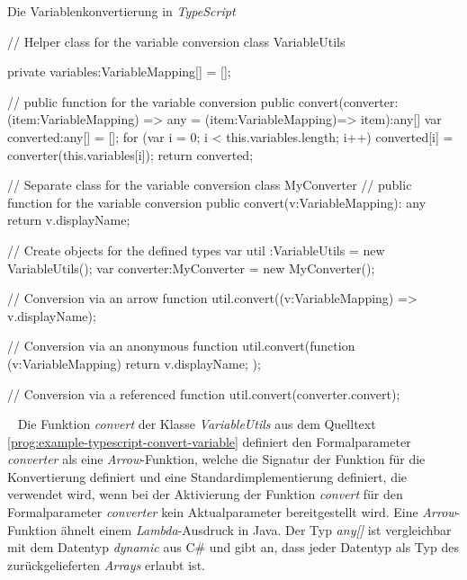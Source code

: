 \begin{program}[h]
\caption{Die Variablenkonvertierung in \emph{TypeScript}}
\label{prog:example-typescript-convert-variable}
\begin{JsCode}
// Helper class for the variable conversion
class VariableUtils {
    private variables:VariableMapping[] = [];
	
    // public function for the variable conversion
    public convert(converter:(item:VariableMapping) => any 
    	                    = (item:VariableMapping)=> item):any[] {
        var converted:any[] = [];
        for (var i = 0; i < this.variables.length; i++) {
            converted[i] = converter(this.variables[i]);
        }
        return converted;	            
    }
}

// Separate class for the variable conversion
class MyConverter {
    // public function for the variable conversion
    public convert(v:VariableMapping): any {
        return v.displayName;
    }
}

// Create objects for the defined types
var util     :VariableUtils = new VariableUtils();
var converter:MyConverter   = new MyConverter();

// Conversion via an arrow function
util.convert((v:VariableMapping) => v.displayName);

// Conversion via an anonymous function
util.convert(function (v:VariableMapping) {
    return v.displayName;
});

// Conversion via a referenced function
util.convert(converter.convert);
\end{JsCode} 
\end{program}
\ \newline
Die Funktion \emph{convert} der Klasse \emph{VariableUtils} aus dem Quelltext \ref{prog:example-typescript-convert-variable} definiert den Formalparameter \emph{converter} als eine \emph{Arrow}-Funktion, welche die Signatur der Funktion für die Konvertierung definiert und eine Standardimplementierung definiert, die verwendet wird, wenn bei der Aktivierung der Funktion \emph{convert} für den Formalparameter \emph{converter} kein Aktualparameter bereitgestellt wird. Eine \emph{Arrow}-Funktion ähnelt einem \emph{Lambda}-Ausdruck in Java. Der Typ \emph{any[]} ist vergleichbar mit dem Datentyp \emph{dynamic} aus C\# und gibt an, dass jeder Datentyp als Typ des zurückgelieferten \emph{Arrays} erlaubt ist.
\newpage

